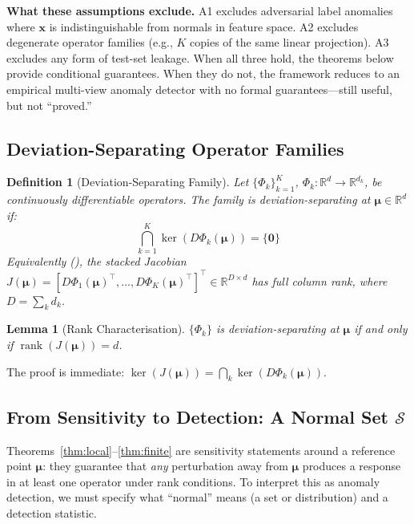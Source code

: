 \documentclass{article}
\newtheorem{lemma}[theorem]{Lemma}
\newtheorem{definition}[theorem]{Definition}
\newcommand{\R}{\mathbb{R}}
\newcommand{\Nset}{\mathcal{S}}  %
\DeclareMathOperator{\rank}{rank}
\begin{document}
\textbf{What these assumptions exclude.} A1 excludes adversarial label anomalies where $\mathbf{x}$ is indistinguishable from normals in feature space. A2 excludes degenerate operator families (e.g., $K$ copies of the same linear projection). A3 excludes any form of test-set leakage. When all three hold, the theorems below provide conditional guarantees. When they do not, the framework reduces to an empirical multi-view anomaly detector with no formal guarantees---still useful, but not ``proved.''

\subsection{Deviation-Separating Operator Families}

\begin{definition}[Deviation-Separating Family]
\label{def:separating}
Let $\{\Phi_k\}_{k=1}^K$, $\Phi_k: \R^d \to \R^{d_k}$, be continuously differentiable operators. The family is \emph{deviation-separating at $\bm{\mu} \in \R^d$} if:
\begin{equation}
\bigcap_{k=1}^{K} \ker\!\left(D\Phi_k(\bm{\mu})\right) = \{\mathbf{0}\}
\label{eq:separating}
\end{equation}
Equivalently (), the stacked Jacobian $J(\bm{\mu}) = [D\Phi_1(\bm{\mu})^\top, \ldots, D\Phi_K(\bm{\mu})^\top]^\top \in \R^{D \times d}$ has full column rank, where $D = \sum_k d_k$.
\end{definition}

\begin{lemma}[Rank Characterisation]
\label{lem:rank}
$\{\Phi_k\}$ is deviation-separating at $\bm{\mu}$ if and only if $\rank(J(\bm{\mu})) = d$.
\end{lemma}

The proof is immediate: $\ker(J(\bm{\mu})) = \bigcap_k \ker(D\Phi_k(\bm{\mu}))$.

\subsection{From Sensitivity to Detection: A Normal Set $\Nset$}

Theorems~\ref{thm:local}--\ref{thm:finite} are sensitivity statements around a reference point $\bm{\mu}$: they guarantee that \emph{any} perturbation away from $\bm{\mu}$ produces a response in at least one operator under rank conditions. To interpret this as anomaly detection, we must specify what ``normal'' means (a set or distribution) and a detection statistic.
\end{document}
